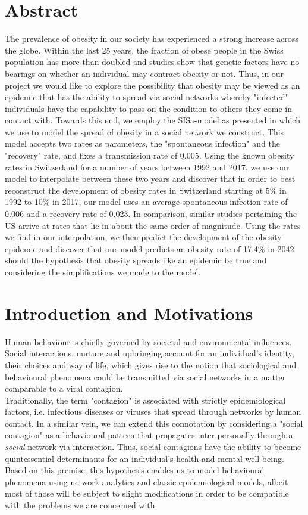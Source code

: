 \documentclass[11pt]{article}
\begin{document}
\section{Abstract}
The prevalence of obesity in our society has experienced a strong increase across the globe. Within the last 25 years, the fraction of obese people in the Swiss population has more than doubled\cite{spreadOfObesityPaper} and studies show that genetic factors have no bearings on whether an individual may contract obesity or not\cite{infectiousDiseaseModeling}. Thus, in our project we would like to explore the possibility that obesity may be viewed as an epidemic that has the ability to spread via social networks whereby "infected" individuals have the capability to pass on the condition to others they come in contact with. Towards this end, we employ the SISa-model as presented in \cite{infectiousDiseaseModeling} which we use to model the spread of obesity in a social network we construct. This model accepts two rates as parameters, the "spontaneous infection" and the "recovery" rate, and fixes a transmission rate of 0.005. Using the known obesity rates in Switzerland for a number of years between 1992 and 2017, we use our model to interpolate between these two years and discover that in order to best reconstruct the development of obesity rates in Switzerland starting at 5\% in 1992 to 10\% in 2017, our model uses an average spontaneous infection rate of 0.006 and a recovery rate of 0.023. In comparison, similar studies pertaining the US arrive at rates that lie in about the same order of magnitude. Using the rates we find in our interpolation, we then predict the development of the obesity epidemic and discover that our model predicts an obesity rate of 17.4\% in 2042 should the hypothesis that obesity spreads like an epidemic be true and considering the simplifications we made to the model. 
\section{Introduction and Motivations}
Human behaviour is chiefly governed by societal and environmental influences. Social interactions, nurture and upbringing account for an individual’s identity, their choices and way of life, which gives rise to the notion that sociological and behavioural phenomena could be transmitted via social networks in a matter comparable to a viral contagion.\\

Traditionally, the term "contagion" is associated with strictly epidemiological factors, i.e. infectious diseases or viruses that spread through networks by human contact. In a similar vein, we can extend this connotation by considering a "social contagion" as a behavioural pattern that propagates inter-personally through a \textit{social} network via interaction. Thus, social contagions have the ability to become quintessential determinants for an individual’s health and mental well-being. Based on this premise, this hypothesis enables us to model behavioural phenomena using network analytics and classic epidemiological models, albeit most of those will be subject to slight modifications in order to be compatible with the problems we are concerned with.\\
\end{document}
